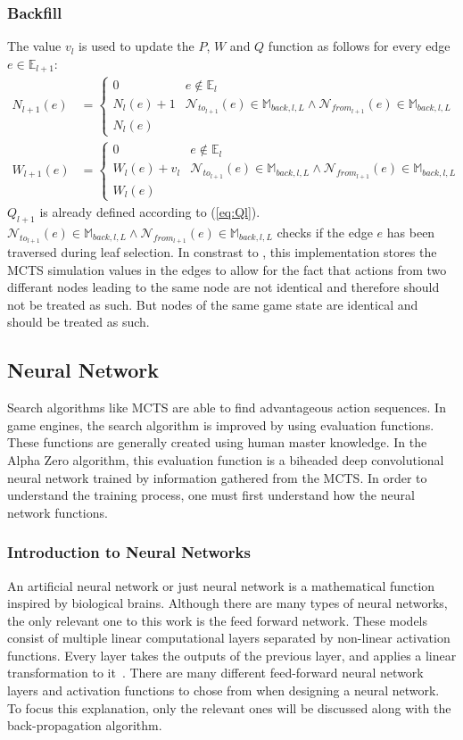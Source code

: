 \documentclass[12pt]{article}
\newcommand{\quckeq}[1]{(\ref{#1})}
\newcommand{\InBreadcrums}[0]{\mathcal N_{to_{l+1}}(e) \in \mathbb M_{back,l,L} \land \mathcal N_{from_{l+1}}(e) \in \mathbb M_{back,l,L}}
\begin{document}
\subsubsection{Backfill}
\label{sec:Methods:MCTS:Backfill}
The value \(v_l\) is used to update the \(P\), \(W\) and \(Q\) function as follows for every edge \(e\in\mathbb E_{l+1}\):
\begin{align}
N_{l+1}(e) &= \left\{\begin{matrix}
0 & e \not\in\mathbb E_l\\
N_l(e)+1 & \InBreadcrums\\
N_l(e)
\end{matrix}\right.\\
%
W_{l+1}(e) &= \left\{\begin{matrix}
0 & e \not\in\mathbb E_l\\
W_l(e)+v_l & \InBreadcrums\\
W_l(e)
\end{matrix}\right.
\end{align}
\(Q_{l+1}\) is already defined according to \quckeq{eq:Ql}. \(\InBreadcrums\) checks if the edge \(e\) has been traversed during leaf selection. \cite{chaslot2008parallel} In constrast to \cite{silver2018general}, this implementation stores the MCTS simulation values in the edges to allow for the fact that actions from two differant nodes leading to the same node are not identical and therefore should not be treated as such. But nodes of the same game state are identical and should be treated as such.

\subsection{Neural Network}
Search algorithms like MCTS are able to find advantageous action sequences. In game engines, the search algorithm is improved by using evaluation functions. These functions are generally created using human master knowledge. In the Alpha Zero algorithm, this evaluation function is a biheaded deep convolutional neural network trained by information gathered from the MCTS. In order to understand the training process, one must first understand how the neural network functions.
\label{NN}
\subsubsection{Introduction to Neural Networks}
An artificial neural network or just neural network is a mathematical function inspired by biological brains. Although there are many types of neural networks, the only relevant one to this work is the feed forward network. These models consist of multiple linear computational layers separated by non-linear activation functions. Every layer takes the outputs of the previous layer, and applies a linear transformation to it~\cite{zhang2018artificial}. There are many different feed-forward neural network layers and activation functions to chose from when designing a neural network. To focus this explanation, only the relevant ones will be discussed along with the back-propagation algorithm.
\end{document}

